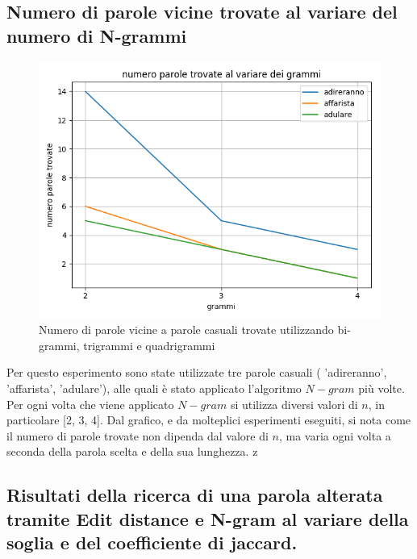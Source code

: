 \documentclass[a4paper,12pt]{article}
\begin{document}
\subsection{Numero di parole vicine trovate al variare del numero di N-grammi}
\begin{figure}[h]
    \centering
    \captionsetup{justification=centering,margin=1.05cm}
    \includegraphics[width=1.0\textwidth]{Figure_4}
    \caption{Numero di parole vicine a parole casuali trovate utilizzando bi-grammi, trigrammi e quadrigrammi}
    \label{fig:test4_1}
\end{figure}
Per questo esperimento sono state utilizzate tre parole casuali ( 'adireranno', 'affarista', 'adulare'), alle quali è stato applicato l'algoritmo $N-gram$ più volte.
\newline
\newline
Per ogni volta che viene applicato $N-gram$ si utilizza diversi valori di $n$, in particolare [2, 3, 4].
\newline
\newline
Dal grafico, e da molteplici esperimenti eseguiti, si nota come il numero di parole trovate non dipenda dal valore di $n$, ma varia ogni volta a seconda della parola scelta e della sua lunghezza.
\newline
z
\clearpage
\subsection{Risultati della ricerca di una parola alterata tramite Edit distance e N-gram al variare della soglia e del coefficiente di jaccard.}
\end{document}
